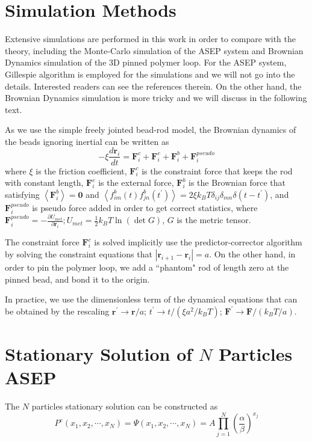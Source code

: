 \documentclass[aps,showpacs,twocolumn,floatfix,prx,superscriptaddress]{revtex4-1}
\begin{document}
\appendix

\section{Simulation Methods}
\label{sec:simulation_methods}

Extensive simulations are performed in this work in order to compare with the theory, including the Monte-Carlo simulation of the ASEP system and Brownian Dynamics simulation of the 3D pinned polymer loop. For the ASEP system, Gillespie algorithm \cite{} is employed for the simulations and we will not go into the details. Interested readers can see the references therein. On the other hand, the Brownian Dynamics simulation is more tricky and we will discuss in the following text.

As we use the simple freely jointed bead-rod model, the Brownian dynamics of the beads ignoring inertial can be written as
\begin{equation}
    \label{eq:beadDynamics}
    -\xi \frac{d \mathbf{r}_i}{d t} = \mathbf{F}_i^{c} + \mathbf{F}_i^{e} + \mathbf{F}_i^{b} + \mathbf{F}_i^{pseudo}
\end{equation}
where $\xi$ is the friction coefficient, $\mathbf{F}_i^{c}$ is the constraint force that keeps the rod with constant length, $\mathbf{F}_i^e$ is the external force, $\mathbf{F}_i^{b}$ is the Brownian force that satisfying $\left<\mathbf{F}_i^{b}\right> = \mathbf{0}$ and $\left<f_{im}^b(t)f_{jn}^b(t^\prime)\right> = 2\xi k_B T \delta_{ij} \delta_{m n}\delta(t-t^\prime)$, and $\mathbf{F}_i^{pseudo}$ is pseudo force added in order to get correct statistics, where $\mathbf{F}_i^{pseudo} = -\frac{\partial U_{met}}{\partial\mathbf{r}_i}; U_{met} = \frac{1}{2}k_B T \ln(\det G)$, $G$ is the metric tensor\cite{}.

The constraint force $\mathbf{F}_i^c$ is solved implicitly use the predictor-corrector algorithm by solving the constraint equations that $|\mathbf{r}_{i+1}-\mathbf{r}_i| = a$. On the other hand, in order to pin the polymer loop, we add a ``phantom" rod of length zero at the pinned bead, and bond it to the origin.

In practice, we use the dimensionless term of the dynamical equations that can be obtained by the rescaling $\mathbf{r}^{\prime}\to \mathbf{r}/a$; $t^{\prime}\to t/(\xi a^2/k_BT)$; $\mathbf{F}^{\prime}\to\mathbf{F}/(k_BT/a)$.



\section{Stationary Solution of $N$ Particles ASEP}
\label{sec:stationary_solution_of_n_particles_asep}
The $N$ particles stationary solution can be constructed as
\begin{equation}
    \label{eq:stationaryN}
    P^e(x_1, x_2, \cdots, x_N) = \Psi(x_1, x_2, \cdots, x_N) =  A
    \prod_{j=1}^N\left(\frac{\alpha}{\beta}\right)^{x_j}
\end{equation}
\end{document}
